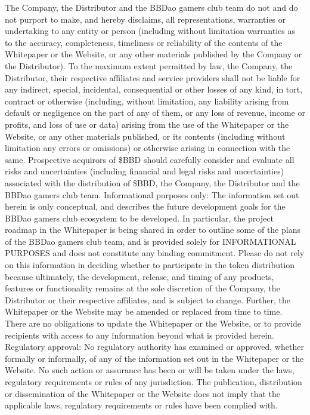 \documentclass[
]{book}
\begin{document}
The Company, the Distributor and the BBDao gamers club team do not and do not purport to make, and hereby disclaims, all representations, warranties or undertaking to any entity or person (including without limitation warranties as to the accuracy, completeness, timeliness or reliability of the contents of the Whitepaper or the Website, or any other materials published by the Company or the Distributor). To the maximum extent permitted by law, the Company, the Distributor, their respective affiliates and service providers shall not be liable for any indirect, special, incidental, consequential or other losses of any kind, in tort, contract or otherwise (including, without limitation, any liability arising from default or negligence on the part of any of them, or any loss of revenue, income or profits, and loss of use or data) arising from the use of the Whitepaper or the Website, or any other materials published, or its contents (including without limitation any errors or omissions) or otherwise arising in connection with the same. Prospective acquirors of \$BBD should carefully consider and evaluate all risks and uncertainties (including financial and legal risks and uncertainties) associated with the distribution of \$BBD, the Company, the Distributor and the BBDao gamers club team.
Informational purposes only: The information set out herein is only conceptual, and describes the future development goals for the BBDao gamers club ecosystem to be developed. In particular, the project roadmap in the Whitepaper is being shared in order to outline some of the plans of the BBDao gamers club team, and is provided solely for INFORMATIONAL PURPOSES and does not constitute any binding commitment. Please do not rely on this information in deciding whether to participate in the token distribution because ultimately, the development, release, and timing of any products, features or functionality remains at the sole discretion of the Company, the Distributor or their respective affiliates, and is subject to change. Further, the Whitepaper or the Website may be amended or replaced from time to time. There are no obligations to update the Whitepaper or the Website, or to provide recipients with access to any information beyond what is provided herein.
Regulatory approval: No regulatory authority has examined or approved, whether formally or informally, of any of the information set out in the Whitepaper or the Website. No such action or assurance has been or will be taken under the laws, regulatory requirements or rules of any jurisdiction. The publication, distribution or dissemination of the Whitepaper or the Website does not imply that the applicable laws, regulatory requirements or rules have been complied with.
\end{document}
